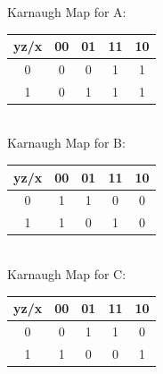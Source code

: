 \documentclass{article}
\begin{document}
 {
     Karnaugh Map for A: \\
     \begin{tabular}{| c | c | c | c | c |}
          \hline
          yz/x & 00 & 01 & 11 & 10 \\
          \hline
          0 & 0 & 0 & 1 & 1 \\
          \hline
          1 & 0 & 1 & 1 & 1 \\
          \hline
     \end{tabular} \\
     \linebreak
     Karnaugh Map for B: \\
     \begin{tabular}{| c | c | c | c | c |}
          \hline
          yz/x & 00 & 01 & 11 & 10 \\
          \hline
          0 & 1 & 1 & 0 & 0 \\
          \hline
          1 & 1 & 0 & 1 & 0 \\
          \hline
     \end{tabular} \\
     \linebreak
     Karnaugh Map for C: \\
     \begin{tabular}{| c | c | c | c | c |}
          \hline
          yz/x & 00 & 01 & 11 & 10 \\
          \hline
          0 & 0 & 1 & 1 & 0 \\
          \hline
          1 & 1 & 0 & 0 & 1 \\
          \hline
     \end{tabular}
}
\end{document}
